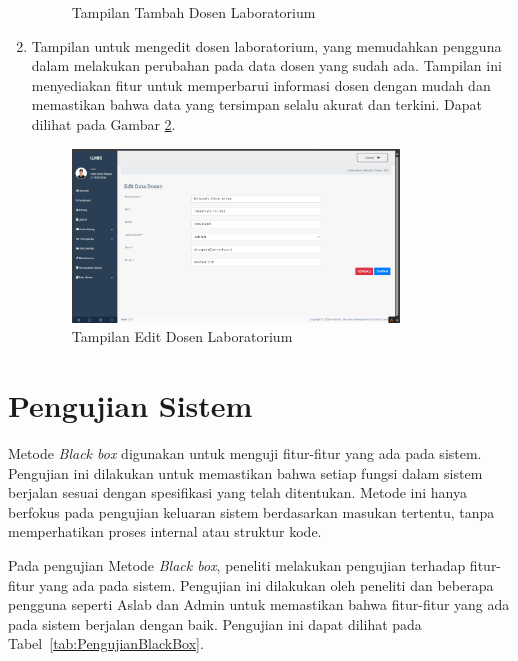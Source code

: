 \begin{enumerate}
\begin{figure}
		      \caption{Tampilan Tambah Dosen Laboratorium}
		      \label{fig:tambah-dosen}
	      \end{figure}
	\item Tampilan untuk mengedit dosen laboratorium, yang memudahkan pengguna dalam melakukan perubahan pada data dosen yang sudah ada. Tampilan ini menyediakan fitur untuk memperbarui informasi dosen dengan mudah dan memastikan bahwa data yang tersimpan selalu akurat dan terkini. Dapat dilihat pada Gambar \ref{fig:edit-dosen}.
	      \begin{figure}
		      \centering
		      \includegraphics[width=0.82\textwidth]{konten/gambar/hasil/edit-dosen.png}
		      \caption{Tampilan Edit Dosen Laboratorium}
		      \label{fig:edit-dosen}
	      \end{figure}
\end{enumerate}

\section{Pengujian Sistem}
Metode \textit{Black box} digunakan untuk menguji fitur-fitur yang ada pada sistem. Pengujian ini dilakukan untuk memastikan bahwa setiap fungsi dalam sistem berjalan sesuai dengan spesifikasi yang telah ditentukan. Metode ini hanya berfokus pada pengujian keluaran sistem berdasarkan masukan tertentu, tanpa memperhatikan proses internal atau struktur kode.

Pada pengujian Metode \textit{Black box}, peneliti melakukan pengujian terhadap fitur-fitur yang ada pada sistem. Pengujian ini dilakukan oleh peneliti dan beberapa pengguna seperti Aslab dan Admin untuk memastikan bahwa fitur-fitur yang ada pada sistem berjalan dengan baik. Pengujian ini dapat dilihat pada Tabel~\ref{tab:PengujianBlackBox}.

